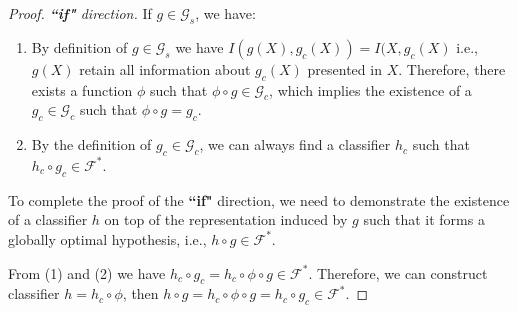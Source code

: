\begin{proof} \textit{\textbf{``if"} direction.} If $g\in \mathcal{G}_s$, we have: 

\begin{enumerate}
    \item By definition of $g\in \mathcal{G}_s$ we have
$I(g(X),g_c(X))=I(X,g_c(X)$ i.e., $g(X)$ retain all information about $g_c(X)$ presented in $X$. Therefore, there exists a function \(\phi\) such that \(\phi \circ g \in \mathcal{G}_c\), which implies the existence of a \(g_c\in \mathcal{G}_c\) such that \(\phi \circ g = g_c\).

    \item By the definition of \(g_c \in \mathcal{G}_c\), we can always find a classifier \(h_c\) such that \(h_c \circ g_c \in \mathcal{F}^*\).

\end{enumerate}

To complete the proof of the \textbf{``if"} direction, we need to demonstrate the existence of a classifier \( h \) on top of the representation induced by \( g \) such that it forms a globally optimal hypothesis, i.e., \( h \circ g \in \mathcal{F}^* \).

From (1) and (2) we have $h_c\circ g_c = h_c\circ \phi \circ g \in \mathcal{F}^*$. Therefore, we can construct classifier $h = h_c \circ \phi$, then $h \circ g =  h_c\circ \phi \circ g =h_c\circ g_c \in \mathcal{F}^*$.
\end{proof}

